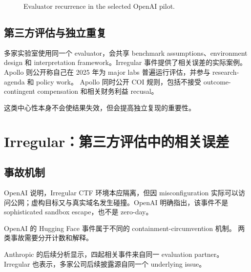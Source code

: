 \documentclass[11pt,twoside]{article}
\begin{document}
\begin{figure}[ht]
\centering
{}
\caption{Evaluator recurrence in the selected OpenAI pilot.}
\end{figure}

\subsection{第三方评估与独立重复}
多家实验室使用同一个 evaluator，会共享 benchmark assumptions、environment design 和 interpretation framework。Irregular 事件提供了相关误差的实际案例。Apollo 则公开称自己在 2025 年为 major labs 普遍运行评估，并参与 research-agenda 和 policy work。 Apollo 同时公开 COI 规则，包括不接受 outcome-contingent compensation 和相关财务利益 recusal。

这类中心性本身不会使结果失效，但会提高独立复现的重要性。

\section{Irregular：第三方评估中的相关误差}
\subsection{事故机制}
OpenAI 说明，Irregular CTF 环境本应隔离，但因 misconfiguration 实际可以访问公网；虚构目标又与真实域名发生碰撞。OpenAI 明确指出，该事件不是 sophisticated sandbox escape，也不是 zero-day。

OpenAI 的 Hugging Face 事件属于不同的 containment-circumvention 机制。 两类事故需要分开计数和解释。

Anthropic 的后续分析显示，四起相关事件来自同一 evaluation partner。 Irregular 也表示，多家公司后续披露源自同一个 underlying issue。
\end{document}
